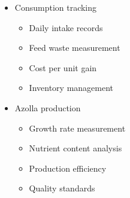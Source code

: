 \begin{itemize}
\begin{itemize}
        \item Consumption tracking
        \begin{itemize}
            \item Daily intake records
            \item Feed waste measurement
            \item Cost per unit gain
            \item Inventory management
        \end{itemize}
        
        \item Azolla production
        \begin{itemize}
            \item Growth rate measurement
            \item Nutrient content analysis
            \item Production efficiency
            \item Quality standards
        \end{itemize}
    \end{itemize}
\end{itemize}

